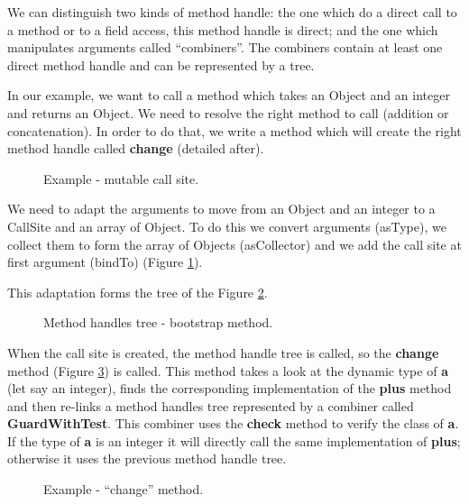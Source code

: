 \documentclass{sig-alternate}
\begin{document}
      We can distinguish two kinds of method handle:
      the one which do a direct call to a method or to a field access, this method handle is direct;
      and the one which manipulates arguments called ``combiners''.
      The combiners contain at least one direct method handle and can be represented by a tree.

      In our example, we want to call a method which takes an Object and an integer and returns an Object.
      We need to resolve the right method to call (addition or concatenation).
      In order to do that, we write a method which will create the right method handle called {\bf change} (detailed after).

      \begin{figure}[!h]
        \centering \vspace{-1.5em}
        \caption{Example - mutable call site.}
        \label{fooMCS}
      \end{figure}

      We need to adapt the arguments to move from an Object and an integer to a CallSite and an array of Object.
      To do this we convert arguments (asType), we collect them to form the array of Objects (asCollector) and we add the call site at first argument (bindTo) (Figure \ref{fooMCS}).

      \noindent This adaptation forms the tree of the Figure \ref{ast1}.

      \begin{figure}[!h]
        \centering \resizebox{.7\linewidth}{!}{}
        \caption{Method handles tree - bootstrap method.}
        \label{ast1}
      \end{figure}

      When the call site is created, the method handle tree is called, so the {\bf change} method (Figure \ref{fooCHANGE}) is called.
      This method takes a look at the dynamic type of {\bf a} (let say an integer),
      finds the corresponding implementation of the {\bf plus} method
      and then re-links a method handles tree represented by a combiner called {\bf GuardWithTest}.
      This combiner uses the {\bf check} method to verify the class of {\bf a}.
      If the type of {\bf a} is an integer it will directly call the same implementation of {\bf plus};
      otherwise it uses the previous method handle tree.

      \begin{figure}[!h]
        \centering \vspace{-1.5em}
        \caption{Example - ``change'' method.}
        \label{fooCHANGE}
      \end{figure}
\end{document}
